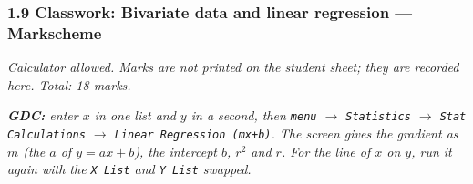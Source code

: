 \documentclass[12pt, twoside]{article}
\begin{document}
\subsubsection*{1.9 Classwork: Bivariate data and linear regression --- Markscheme}

\emph{Calculator allowed. Marks are not printed on the student sheet; they are
recorded here. Total: 18 marks.}

\emph{\textbf{GDC:} enter $x$ in one list and $y$ in a second, then
\texttt{menu} $\rightarrow$ \texttt{Statistics} $\rightarrow$ \texttt{Stat
Calculations} $\rightarrow$ \texttt{Linear Regression (mx+b)}. The screen
gives the gradient as $m$ (the $a$ of $y = ax + b$), the intercept $b$, $r^{2}$
and $r$. For the line of $x$ on $y$, run it again with the \texttt{X List} and
\texttt{Y List} swapped.}
\end{document}
